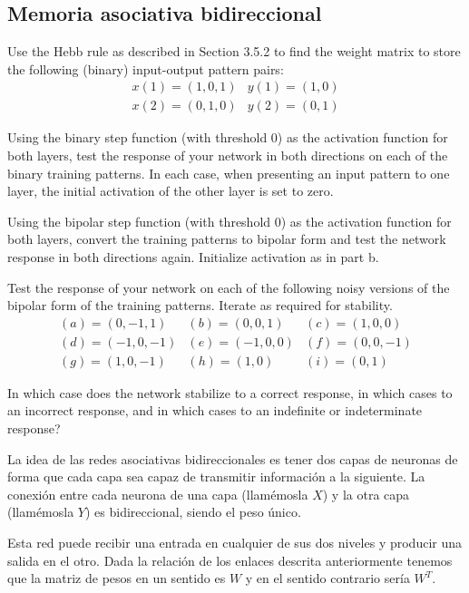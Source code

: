 \subsection{Memoria asociativa bidireccional}

\begin{problem}[10]
\ppart Use the Hebb rule as described in Section 3.5.2 to find the weight matrix to store
the following (binary) input-output pattern pairs:
\[\begin{array}{ll}
x(1)=(1,0,1) & y(1)=(1,0)\\
x(2) = (0,1,0) & y(2) = (0,1)
\end{array}\]

\ppart Using the binary step function (with threshold 0) as the activation function for both layers, test the response of your network in both directions on each of the
binary training patterns. In each case, when presenting an input pattern to one
layer, the initial activation of the other layer is set to zero.

\ppart Using the bipolar step function (with threshold 0) as the activation function for both layers, convert the training patterns to bipolar form and test the network response in both directions again. Initialize activation as in part b.

\ppart Test the response of your network on each of the following noisy versions of the bipolar form of the training patterns. Iterate as required for stability.
\[\begin{array}{lll}
(a)=(0,-1,1) & (b)=(0,0,1) & (c) = (1,0,0)\\
(d)=(-1,0,-1) & (e) = (-1,0,0) & (f) = (0,0,-1) \\
(g) = (1,0,-1) & (h)=(1,0) & (i) = (0,1)
\end{array}\]

\ppart  In which case does the network stabilize to a correct response, in which cases to an incorrect response, and in which cases to an indefinite or indeterminate response?

\solution
{}

La idea de las redes asociativas bidireccionales es tener dos capas de neuronas de forma que cada capa sea capaz de transmitir información a la siguiente. La conexión entre cada neurona de una capa (llamémosla $X$) y la otra capa (llamémosla $Y$) es bidireccional, siendo el peso único.

Esta red puede recibir una entrada en cualquier de sus dos niveles y producir una salida en el otro. Dada la relación de los enlaces descrita anteriormente tenemos que la matriz de pesos en un sentido es $W$ y en el sentido contrario sería $W^T$.


\end{problem}
